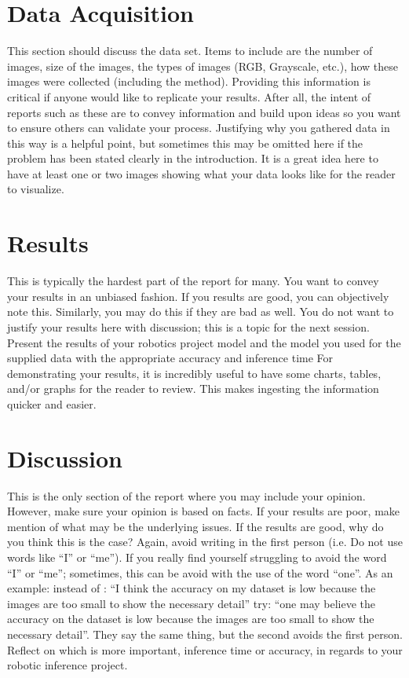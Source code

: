 \documentclass[10pt,journal,compsoc]{IEEEtran}
\begin{document}
\section{Data Acquisition}
This section should discuss the data set. Items to include are the number of images, size of the images, the types of images (RGB, Grayscale, etc.), how these images were collected (including the method). Providing this information is critical if anyone would like to replicate your results. After all, the intent of reports such as these are to convey information and build upon ideas so you want to ensure others can validate your process.
Justifying why you gathered data in this way is a helpful point, but sometimes this may be omitted here if the problem has been stated clearly in the introduction.
It is a great idea here to have at least one or two images showing what your data looks like for the reader to visualize.

\section{Results}
This is typically the hardest part of the report for many. You want to convey your results in an unbiased fashion. If you results are good, you can objectively note this. Similarly, you may do this if they are bad as well. You do not want to justify your results here with discussion; this is a topic for the next session. 
Present the results of your robotics project model and the model you used for the supplied data with the appropriate accuracy and inference time
For demonstrating your results, it is incredibly useful to have some charts, tables, and/or graphs for the reader to review. This makes ingesting the information quicker and easier.

\section{Discussion}
This is the only section of the report where you may include your opinion. However, make sure your opinion is based on facts. If your results are poor, make mention of what may be the underlying issues. If the results are good, why do you think this is the case? Again, avoid writing in the first person (i.e. Do not use words like “I” or “me”). If you really find yourself struggling to avoid the word “I” or “me”; sometimes, this can be avoid with the use of the word “one”. As an example: instead of : “I think the accuracy on my dataset is low because the images are too small to show the necessary detail” try: “one may believe the accuracy on the dataset is low because the images are too small to show the necessary detail”. They say the same thing, but the second avoids the first person. 
Reflect on which is more important, inference time or accuracy, in regards to your robotic inference project.
\end{document}
